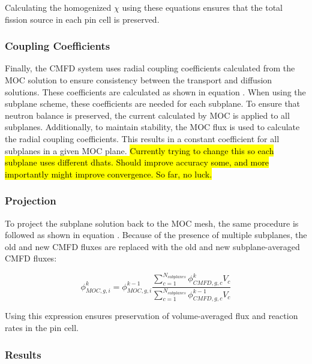 {Calculating the homogenized $\chi$ using these equations ensures that the total fission source in each pin cell is preserved.

\subsubsection{Coupling Coefficients}

Finally, the CMFD system uses radial coupling coefficients calculated from the MOC solution to ensure consistency between the transport and diffusion solutions.  These coefficients are calculated as shown in equation .  When using the subplane scheme, these coefficients are needed for each subplane.  To ensure that neutron balance is preserved, the current calculated by MOC is applied to all subplanes.  Additionally, to maintain stability, the MOC flux is used to calculate the radial coupling coefficients.  This results in a constant coefficient for all subplanes in a given MOC plane.  \hl{Currently trying to change this so each subplane uses different dhats.  Should improve accuracy some, and more importantly might improve convergence.  So far, no luck.}

\subsubsection{Projection}

To project the subplane solution back to the MOC mesh, the same procedure is followed as shown in equation .  Because of the presence of multiple subplanes, the old and new CMFD fluxes are replaced with the old and new subplane-averaged CMFD fluxes:

\begin{equation}
\phi_{MOC,g,i}^k = \phi_{MOC,g,i}^{k-1} \frac{\sum_{c=1}^{N_{subplanes}} \phi_{CMFD,g,c}^k V_c}{\sum_{c=1}^{N_{subplanes}} \phi_{CMFD,g,c}^{k-1} V_c}
\end{equation}

Using this expression ensures preservation of volume-averaged flux and reaction rates in the pin cell.

\subsubsection{Results}


}
